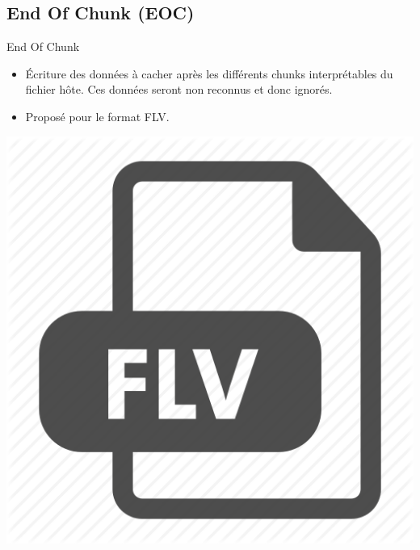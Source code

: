 \documentclass{beamer}
\begin{document}
    \subsection{End Of Chunk (EOC)}
    \begin{frame}
    
	\begin{block}{End Of Chunk}
	\begin{itemize}
	[circle]
	\item Écriture des données à cacher après les différents chunks interprétables 
	du fichier hôte. Ces données seront non reconnus et donc ignorés. 
	\item Proposé pour le format FLV.  
	\end{itemize}
	\end{block}
	
	\hspace{4.3cm}
    \includegraphics[scale=0.08]{pictures/flv_512.png}
    
    \end{frame}
  
\end{document}

